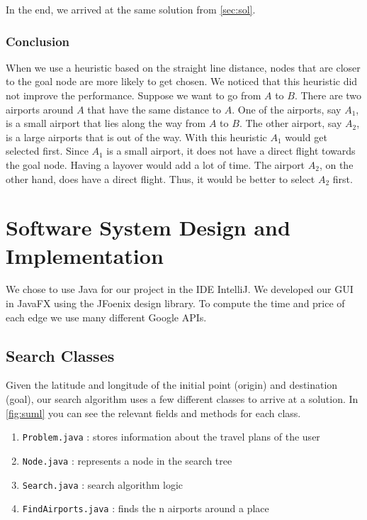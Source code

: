 \documentclass[11pt]{article}
\begin{document}
In the end, we arrived at the same solution from \ref{sec:sol}.

\subsubsection{Conclusion}

When we use a heuristic based on the straight line distance, nodes that are closer to the goal node are more likely to get chosen. We noticed that this heuristic did not improve the performance. Suppose we want to go from $A$ to $B$. There are two airports around $A$ that have the same distance to $A$. One of the airports, say $A_1$, is a small airport that lies along the way from $A$ to $B$. The other airport, say $A_2$, is a large airports that is out of the way. With this heuristic $A_1$ would get selected first. Since $A_1$ is a small airport, it does not have a direct flight towards the goal node. Having a layover would add a lot of time. The airport $A_2$, on the other hand, does have a direct flight. Thus, it would be better to select $A_2$ first. 

\section{Software System Design and Implementation}

We chose to use Java for our project in the IDE IntelliJ. We developed our GUI in JavaFX using the JFoenix design library.
To compute the time and price of each edge we use many different Google APIs. 

\subsection{Search Classes}

Given the latitude and longitude of the initial point (origin) and destination (goal), our search algorithm uses a few different classes to arrive at a solution.
In \ref{fig:suml} you can see the relevant fields and methods for each class.
\begin{enumerate}
\item \texttt{Problem.java} : stores information about the travel plans of the user 
\item \texttt{Node.java} : represents a node in the search tree
\item \texttt{Search.java} : search algorithm logic
\item \texttt{FindAirports.java} : finds the n airports around a place
\end{enumerate}
\end{document}
